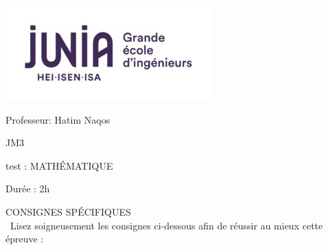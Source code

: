 \documentclass{book}%
\begin{document}
%
\normalsize%
\newpage%
\thispagestyle{empty}%
\vskip-40mm	\includegraphics[scale=0.5]{logo.png} \\%
 \begin{flushright}  \vskip-20mm   Professeur: Hatim Naqos\vskip15mm  \end{flushright}%
JM3%
\begin{center}   \begin{Large}test : MATHÉMATIQUE\end{Large} \end{center}%
Durée : 2h%
 \begin{center} { \large CONSIGNES SPÉCIFIQUES } \\\ Lisez soigneusement les consignes ci-dessous afin de réussir au mieux cette épreuve : \end{center} %
\end{document}

